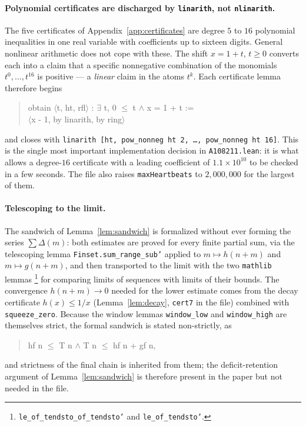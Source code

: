 \documentclass[11pt]{article}
\theoremstyle{plain}
\theoremstyle{definition}
\theoremstyle{remark}
\numberwithin{equation}{section}
\begin{document}
\paragraph{Polynomial certificates are discharged by \texttt{linarith}, not \texttt{nlinarith}.}
The five certificates of Appendix~\ref{app:certificates} are degree $5$ to $16$ polynomial
inequalities in one real variable with coefficients up to sixteen digits. General nonlinear
arithmetic does not cope with these. The shift $x = 1+t$, $t \ge 0$ converts each into a claim
that a specific nonnegative combination of the monomials $t^0, \dots, t^{16}$ is positive ---
a \emph{linear} claim in the atoms $t^k$. Each certificate lemma therefore begins
\begin{quote}\ttfamily\small
obtain $\langle$t, ht, rfl$\rangle$ : $\exists$ t, 0 $\le$ t $\wedge$ x = 1 + t :=\\
\hspace*{2em}$\langle$x - 1, by linarith, by ring$\rangle$
\end{quote}
and closes with \texttt{linarith [ht, pow\_nonneg ht 2, \ldots, pow\_nonneg ht 16]}. This is the
single most important implementation decision in \texttt{A108211.lean}: it is what allows a
degree-$16$ certificate with a leading coefficient of $1.1 \times 10^{10}$ to be checked in a few
seconds. The file also raises \texttt{maxHeartbeats} to $2{,}000{,}000$ for the largest of them.

\paragraph{Telescoping to the limit.}
The sandwich of Lemma~\ref{lem:sandwich} is formalized without ever forming the series
$\sum \Delta(m)$: both estimates are proved for every finite partial sum, via the telescoping
lemma \texttt{Finset.sum\_range\_sub'} applied to $m \mapsto h(n+m)$ and $m \mapsto g(n+m)$, and then
transported to the limit with the two \texttt{mathlib} lemmas%
\footnote{\texttt{le\_of\_tendsto\_of\_tendsto'} and \texttt{le\_of\_tendsto'}.}
for comparing limits of sequences with limits of their bounds.
The convergence $h(n+m) \to 0$ needed for the lower estimate comes from the decay certificate
$h(x) \le 1/x$ (Lemma~\ref{lem:decay}, \texttt{cert7} in the file) combined with
\texttt{squeeze\_zero}. Because the window lemmas \texttt{window\_low} and \texttt{window\_high}
are themselves strict, the formal sandwich is stated non-strictly, as
\begin{quote}\ttfamily\small
hf n $\le$ T n $\wedge$ T n $\le$ hf n + gf n,
\end{quote}
and strictness of the final chain is inherited from them; the deficit-retention argument of
Lemma~\ref{lem:sandwich} is therefore present in the paper but not needed in the file.
\end{document}
